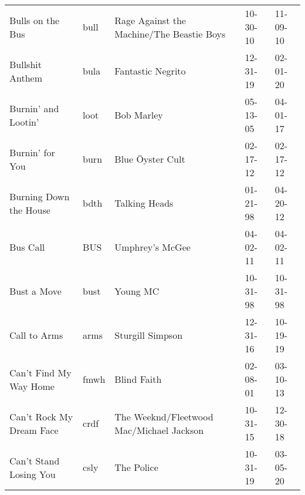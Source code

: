 \begin{longtable}{p{}p{}p{}p{}p{}}
                                                        Bulls on the Bus &          bull &                Rage Against the Machine/The Beastie Boys &              10-30-10 &             11-09-10 \\
                                                         Bullshit Anthem &          bula &                                        Fantastic Negrito &              12-31-19 &             02-01-20 \\
                                                     Burnin' and Lootin' &          loot &                                               Bob Marley &              05-13-05 &             04-01-17 \\
                                                         Burnin' for You &          burn &                                         Blue Öyster Cult &              02-17-12 &             02-17-12 \\
                                                  Burning Down the House &          bdth &                                            Talking Heads &              01-21-98 &             04-20-12 \\
                                                                Bus Call &           BUS &                                          Umphrey's McGee &              04-02-11 &             04-02-11 \\
                                                             Bust a Move &          bust &                                                 Young MC &              10-31-98 &             10-31-98 \\
                                                            Call to Arms &          arms &                                         Sturgill Simpson &              12-31-16 &             10-19-19 \\
                                                  Can't Find My Way Home &          fmwh &                                              Blind Faith &              02-08-01 &             03-10-13 \\
                                                Can't Rock My Dream Face &          crdf &                 The Weeknd/Fleetwood Mac/Michael Jackson &              10-31-15 &             12-30-18 \\
                                                  Can't Stand Losing You &          csly &                                               The Police &              10-31-19 &             03-05-20 \\

\end{longtable}
